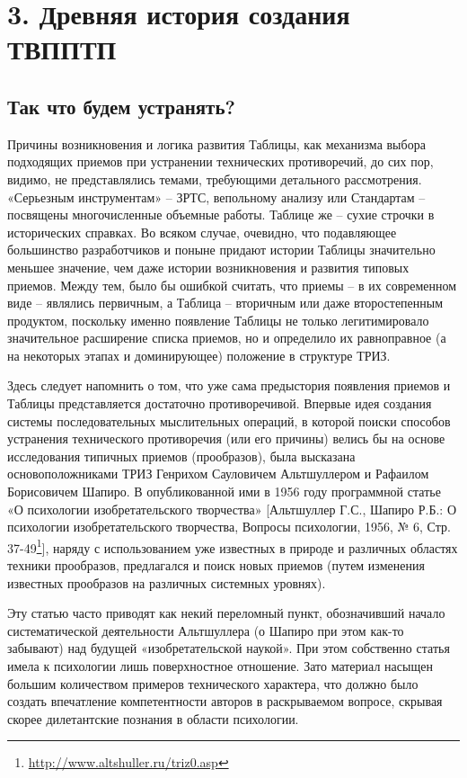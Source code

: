 \documentclass[11pt,a4paper]{article}
\begin{document}
\section*{3. Древняя история создания ТВППТП}

\subsection*{Так что будем устранять?}

Причины возникновения и логика развития Таблицы, как механизма выбора
подходящих приемов при устранении технических противоречий, до сих пор,
видимо, не представлялись темами, требующими детального
рассмотрения. «Серьезным инструментам» -- ЗРТС, вепольному анализу или
Стандартам -- посвящены многочисленные объемные работы. Таблице же -- сухие
строчки в исторических справках. Во всяком случае, очевидно, что подавляющее
большинство разработчиков и поныне придают истории Таблицы значительно меньшее
значение, чем даже истории возникновения и развития типовых приемов. Между
тем, было бы ошибкой считать, что приемы -- в их современном виде -- являлись
первичным, а Таблица -- вторичным или даже второстепенным продуктом, поскольку
именно появление Таблицы не только легитимировало значительное расширение
списка приемов, но и определило их равноправное (а на некоторых этапах и
доминирующее) положение в структуре ТРИЗ.

Здесь следует напомнить о том, что уже сама предыстория появления приемов и
Таблицы представляется достаточно противоречивой. Впервые идея создания
системы последовательных мыслительных операций, в которой поиски способов
устранения технического противоречия (или его причины) велись бы на основе
исследования типичных приемов (прообразов), была высказана основоположниками
ТРИЗ Генрихом Сауловичем Альтшуллером и Рафаилом Борисовичем Шапиро. В
опубликованной ими в 1956 году программной статье «О психологии
изобретательского творчества» [Альтшуллер Г.С., Шапиро Р.Б.: О психологии
  изобретательского творчества, Вопросы психологии, 1956, № 6,
  Стр. 37-49\footnote{\url{http://www.altshuller.ru/triz0.asp}}], наряду с
использованием уже известных в природе и различных областях техники
прообразов, предлагался и поиск новых приемов (путем изменения известных
прообразов на различных системных уровнях).

Эту статью часто приводят как некий переломный пункт, обозначивший начало
систематической деятельности Альтшуллера (о Шапиро при этом как-то забывают)
над будущей «изобретательской наукой». При этом собственно статья имела к
психологии лишь поверхностное отношение. Зато материал насыщен большим
количеством примеров технического характера, что должно было создать
впечатление компетентности авторов в раскрываемом вопросе, скрывая скорее
дилетантские познания в области психологии.
\end{document}
